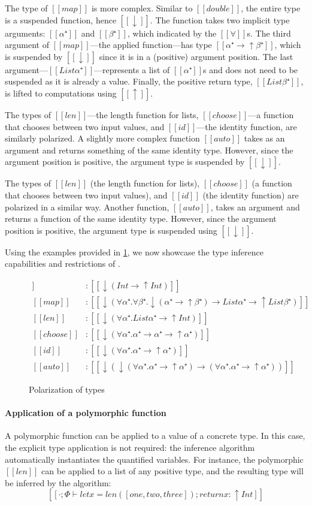 The type of $[[map]]$ is more complex. Similar to $[[double]]$, the
entire type is a suspended function, hence $[[↓]]$. The function takes two implicit type
arguments: $[[α⁺]]$ and $[[β⁺]]$, which indicated by the $[[∀]]$s.
The third argument of $[[map]]$---the applied function---has type $[[α⁺ → ↑β⁺]]$,
which is suspended by $[[↓]]$ since it is in a (positive) argument position. 
The last argument---$[[List α⁺]]$---represents a list of $[[α⁺]]$s and does not need
to be suspended as it is already a value. Finally, the positive return type,
$[[List β⁺]]$, is lifted to computations using $[[↑]]$.

The types of $[[len]]$---the length function for lists, $[[choose]]$---a
function that chooses between two input values, and $[[id]]$---the identity
function, are similarly polarized. A slightly more complex function $[[auto]]$
takes as an argument and returns something of the same identity type. However,
since the argument position is positive, the argument type is suspended by
$[[↓]]$.

The types of $[[len]]$ (the length function for lists), $[[choose]]$ (a function
that chooses between two input values), and $[[id]]$ (the identity function) are
polarized in a similar way. Another function, $[[auto]]$, takes an argument and returns
a function of the same identity type. However, since the argument position is
positive, the argument type is suspended using $[[↓]]$.

Using the examples provided in \cref{fig:polarization-examples}, we now showcase 
the type inference capabilities and restrictions of \fexists.

\begin{figure}[t]
  \begin{align*}
    [[double]] &: [[↓(Int → ↑Int)]] \\
    [[map]] &: [[↓(∀α⁺.∀β⁺.↓(α⁺ → ↑β⁺) → List α⁺ → ↑List β⁺)]] \\
    [[len]] &: [[↓(∀α⁺.List α⁺ → ↑Int)]] \\
    [[choose]] &: [[↓(∀α⁺.α⁺ → α⁺ → ↑α⁺)]] \\
    [[id]] &: [[↓(∀α⁺.α⁺ → ↑α⁺)]] \\
    [[auto]] &: [[↓(↓(∀α⁺.α⁺ → ↑α⁺) → (∀α⁺.α⁺ → ↑α⁺))]]
  \end{align*}
  \caption{Polarization of \systemf types}
  \label{fig:polarization-examples}
\end{figure}

\paragraph*{Application of a polymorphic function}
  A polymorphic function can be applied to a value of a concrete type. In this
  case, the explicit type application is not required: the inference algorithm
  automatically instantiates the quantified variables. For instance, the
  polymorphic $[[len]]$ can be applied to a list of any positive type, and the
  resulting type will be inferred by the algorithm:
  $$[[· ; Φ ⊢ let x = len([one,two,three]); return x : ↑Int]]$$

